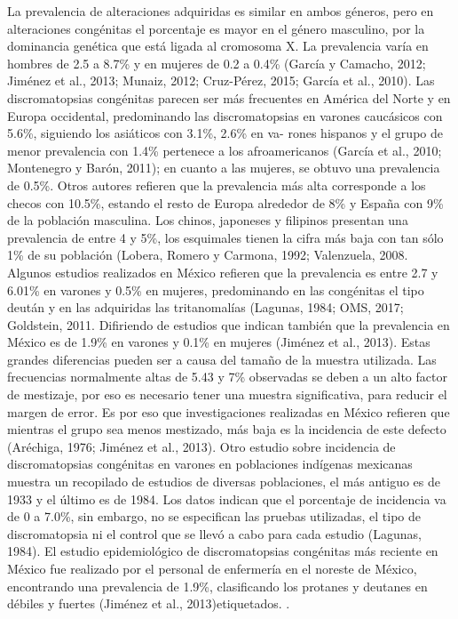 \documentclass[10pt]{article}
\begin{document}
La prevalencia de alteraciones adquiridas es similar en ambos géneros, pero en alteraciones congénitas el porcentaje es mayor en el género masculino, por la dominancia genética que está ligada al cromosoma X. La prevalencia varía en hombres de 2.5 a 8.7\% y en mujeres de 0.2 a 0.4\% (García y Camacho, 2012; Jiménez et al., 2013; Munaiz, 2012; Cruz-Pérez, 2015; García et al., 2010).
Las discromatopsias congénitas parecen ser más frecuentes en América del Norte y en Europa occidental, predominando las discromatopsias en varones caucásicos con 5.6\%, siguiendo los asiáticos con 3.1\%, 2.6\% en va- rones hispanos y el grupo de menor prevalencia con 1.4\% pertenece a los afroamericanos (García et al., 2010; Montenegro y Barón, 2011); en cuanto a las mujeres, se obtuvo una prevalencia de 0.5\%.
Otros autores refieren que la prevalencia más alta corresponde a los checos con 10.5\%, estando el resto de Europa alrededor de 8\% y España con 9\% de la población masculina.
Los chinos, japoneses y filipinos presentan una prevalencia de entre 4 y 5\%, los esquimales tienen la cifra más baja con tan sólo 1\% de su población (Lobera, Romero y Carmona, 1992; Valenzuela, 2008. Algunos estudios realizados en México refieren que la prevalencia es entre 2.7 y 6.01\% en varones y 0.5\% en mujeres, predominando en las congénitas el tipo deután y en las adquiridas las tritanomalías (Lagunas, 1984; OMS, 2017; Goldstein, 2011. Difiriendo de estudios que indican también que la prevalencia en México es de 1.9\% en varones y 0.1\% en mujeres (Jiménez et al., 2013). Estas grandes diferencias pueden ser a causa del tamaño de la muestra utilizada. Las frecuencias normalmente altas de 5.43 y 7\% observadas se deben a un alto factor de mestizaje, por eso es necesario tener una muestra significativa, para reducir el margen de error. Es por eso que investigaciones realizadas en México refieren que mientras el grupo sea menos mestizado, más baja es la incidencia de este defecto (Aréchiga, 1976; Jiménez et al., 2013).
Otro estudio sobre incidencia de discromatopsias congénitas en varones en poblaciones indígenas mexicanas muestra un recopilado de estudios de diversas poblaciones, el más antiguo es de 1933 y el último es de 1984. Los datos indican que el porcentaje de incidencia va de 0 a 7.0\%, sin embargo, no se especifican las pruebas utilizadas, el tipo de discromatopsia ni el control que se llevó a cabo para cada estudio (Lagunas, 1984).
El estudio epidemiológico de discromatopsias congénitas más reciente en México fue realizado por el personal de enfermería en el noreste de México, encontrando una prevalencia de 1.9\%, clasificando los protanes y deutanes en débiles y fuertes (Jiménez et al., 2013)etiquetados. \cite{IEEEreferencias:Ref27}.
\end{document}
